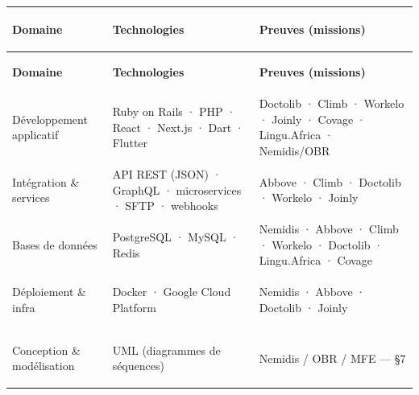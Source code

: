 \renewcommand{\arraystretch}{1.2}
\begin{longtable}{>{\bfseries\raggedright\arraybackslash}p{3.2cm} >{\raggedright\arraybackslash}p{5.2cm} >{\raggedright\arraybackslash}p{8.3cm}}
  \toprule
  \textbf{Domaine} & \textbf{Technologies} & \textbf{Preuves (missions)} \\
  \midrule
  \endfirsthead

  \toprule
  \textbf{Domaine} & \textbf{Technologies} & \textbf{Preuves (missions)} \\
  \midrule
  \endhead

  \bottomrule
  \endlastfoot

  Développement applicatif
    & Ruby on Rails · PHP · React · Next.js · Dart · Flutter
    & Doctolib · Climb · Workelo · Joinly · Covage · Lingu.Africa · Nemidis/OBR \\

  Intégration \& services
    & API REST (JSON) · GraphQL · microservices · SFTP · webhooks
    & Abbove · Climb · Doctolib · Workelo · Joinly \\

  Bases de données
    & PostgreSQL · MySQL · Redis
    & Nemidis · Abbove · Climb · Workelo · Doctolib · Lingu.Africa · Covage \\

  Déploiement \& infra
    & Docker · Google Cloud Platform
    & Nemidis · Abbove · Doctolib · Joinly \\

  Conception \& modélisation
    & UML (diagrammes de séquences)
    & Nemidis / OBR / MFE — §7 \\

  \bottomrule
\end{longtable}
